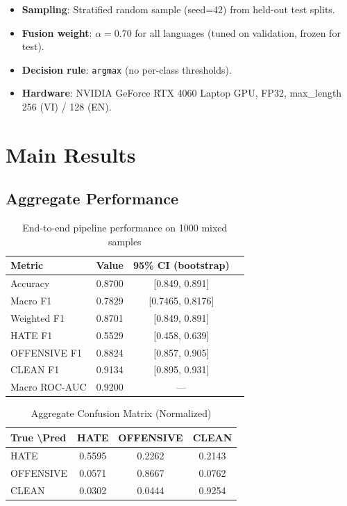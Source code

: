 \documentclass[11pt,a4paper]{article}
\begin{document}
\begin{itemize}
    \item \textbf{Sampling}: Stratified random sample (seed=42) from held-out test splits.
    \item \textbf{Fusion weight}: $\alpha = 0.70$ for all languages (tuned on validation, frozen for test).
    \item \textbf{Decision rule}: \texttt{argmax} (no per-class thresholds).
    \item \textbf{Hardware}: NVIDIA GeForce RTX 4060 Laptop GPU, FP32, max\_length 256 (VI) / 128 (EN).
\end{itemize}

\section{Main Results}
\label{sec:results}

\subsection{Aggregate Performance}

\begin{table}[H]
\centering
\caption{End-to-end pipeline performance on 1000 mixed samples}
\label{tab:aggregate}
\begin{tabular}{lccc}
\toprule
Metric & Value & 95\% CI (bootstrap) \\
\midrule
Accuracy          & 0.8700 & [0.849, 0.891] \\
Macro F1          & 0.7829 & [0.7465, 0.8176] \\
Weighted F1       & 0.8701 & [0.849, 0.891] \\
HATE F1           & 0.5529 & [0.458, 0.639] \\
OFFENSIVE F1      & 0.8824 & [0.857, 0.905] \\
CLEAN F1          & 0.9134 & [0.895, 0.931] \\
Macro ROC-AUC     & 0.9200 & --- \\
\bottomrule
\end{tabular}
\end{table}

\begin{table}[H]
\centering
\caption{Aggregate Confusion Matrix (Normalized)}
\label{tab:cm_overall}
\begin{tabular}{lccc}
\toprule
True \textbackslash Pred & HATE & OFFENSIVE & CLEAN \\
\midrule
HATE       & 0.5595 & 0.2262 & 0.2143 \\
OFFENSIVE  & 0.0571 & 0.8667 & 0.0762 \\
CLEAN      & 0.0302 & 0.0444 & 0.9254 \\
\bottomrule
\end{tabular}
\end{table}
\end{document}
